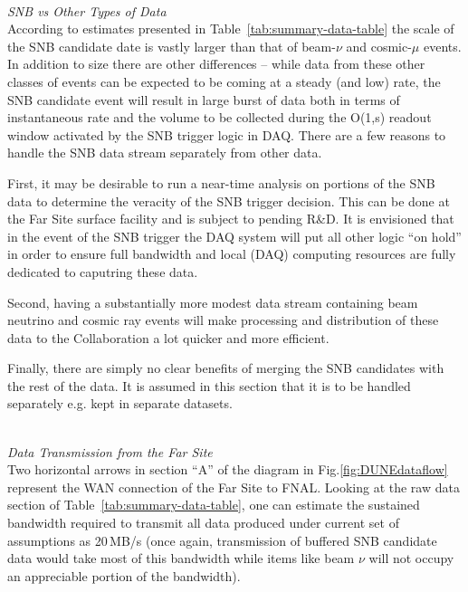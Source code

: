 \ 
\\
\noindent
\textit{SNB vs Other Types of Data} 
\ 
\\
\noindent
According to estimates presented in Table~\ref{tab:summary-data-table} the scale of the SNB candidate date  is vastly larger than
that of beam-$\nu$ and cosmic-$\mu$ events. In addition to size there are other differences -- while data from these other classes of events
can be expected to be coming at a steady (and low) rate, the SNB candidate event will result in large burst of data both in terms of
instantaneous rate and the volume to be collected during the O(1,s) readout window activated by the SNB trigger logic in DAQ.
There are a few reasons to handle the SNB data stream separately from other data.

First, it may be desirable to run a near-time
analysis on portions of the SNB data to determine the veracity of the SNB trigger decision. This can be done at the Far Site surface facility
and is subject to pending R\&D.
It is envisioned that in the event of the SNB trigger the DAQ system will put all other logic ``on hold''
in order to ensure full bandwidth and local (DAQ) computing resources are fully dedicated to caputring these data.

Second, having a substantially more modest data stream containing beam neutrino and cosmic ray
events will make processing and distribution of these data to the Collaboration a lot quicker and more efficient.

Finally, there are simply 
no clear benefits of merging the SNB candidates with the rest of the data. It is assumed in this section that it is to be handled
separately e.g. kept in separate datasets.

\ 
\\

\noindent
\textit{Data Transmission from the Far Site} 
\ 
\\
\noindent
Two horizontal arrows in section ``A'' of the diagram in Fig.\ref{fig:DUNEdataflow} represent the WAN connection of
the Far Site to FNAL. Looking at the raw data section of Table~\ref{tab:summary-data-table}, one can estimate
the sustained bandwidth required to transmit all data produced under current set of assumptions as 20\,MB/s (once
again, transmission of buffered SNB candidate data would take most of this bandwidth while items like beam $\nu$
will not occupy an appreciable portion of the bandwidth).

